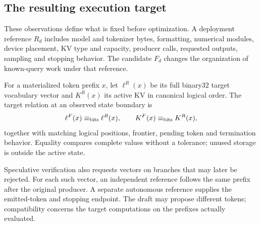 \subsection{The resulting execution target}
These observations define what is fixed before optimization. A deployment reference $R_d$ includes model and tokenizer bytes, formatting, numerical modules, device placement, KV type and capacity, producer calls, requested outputs, sampling and stopping behavior. The candidate $F_d$ changes the organization of known-query work under that reference.

For a materialized token prefix $x$, let $\ell^R(x)$ be its full binary32 target vocabulary vector and $K^R(x)$ its active KV in canonical logical order. The target relation at an observed state boundary is
\begin{equation}
 \ell^F(x)\mathrel{\equiv_{\mathrm{bits}}}\ell^R(x),\qquad K^F(x)\mathrel{\equiv_{\mathrm{bits}}} K^R(x),
 \label{eq:contract}
\end{equation}
together with matching logical positions, frontier, pending token and termination behavior. Equality compares complete values without a tolerance; unused storage is outside the active state.

Speculative verification also requests vectors on branches that may later be rejected. For each such vector, an independent reference follows the same prefix after the original producer. A separate autonomous reference supplies the emitted-token and stopping endpoint. The draft may propose different tokens; compatibility concerns the target computations on the prefixes actually evaluated.
